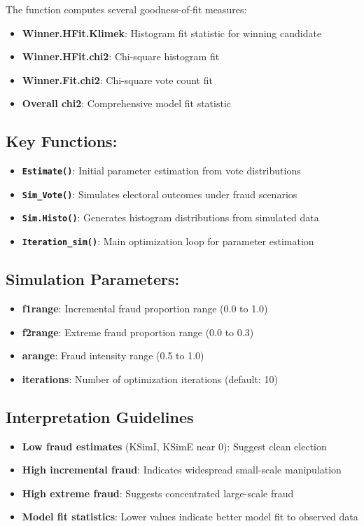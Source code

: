 \documentclass{article}
\begin{document}
The function computes several goodness-of-fit measures:

\begin{itemize}
    \item \textbf{Winner.HFit.Klimek}: Histogram fit statistic for winning candidate
    \item \textbf{Winner.HFit.chi2}: Chi-square histogram fit
    \item \textbf{Winner.Fit.chi2}: Chi-square vote count fit
    \item \textbf{Overall chi2}: Comprehensive model fit statistic
\end{itemize}

\subsection{Key Functions:}
\begin{itemize}
    \item \textbf{\texttt{Estimate()}}: Initial parameter estimation from vote distributions
    \item \textbf{\texttt{Sim\_Vote()}}: Simulates electoral outcomes under fraud scenarios
    \item \textbf{\texttt{Sim.Histo()}}: Generates histogram distributions from simulated data
    \item \textbf{\texttt{Iteration\_sim()}}: Main optimization loop for parameter estimation
\end{itemize}

\subsection{Simulation Parameters:}
\begin{itemize}
    \item \textbf{f1range}: Incremental fraud proportion range (0.0 to 1.0)
    \item \textbf{f2range}: Extreme fraud proportion range (0.0 to 0.3)  
    \item \textbf{arange}: Fraud intensity range (0.5 to 1.0)
    \item \textbf{iterations}: Number of optimization iterations (default: 10)
\end{itemize}

\subsection{Interpretation Guidelines}
\begin{itemize}
    \item \textbf{Low fraud estimates} (KSimI, KSimE near 0): Suggest clean election
    \item \textbf{High incremental fraud}: Indicates widespread small-scale manipulation
    \item \textbf{High extreme fraud}: Suggests concentrated large-scale fraud
    \item \textbf{Model fit statistics}: Lower values indicate better model fit to observed data
\end{itemize}
\end{document}
